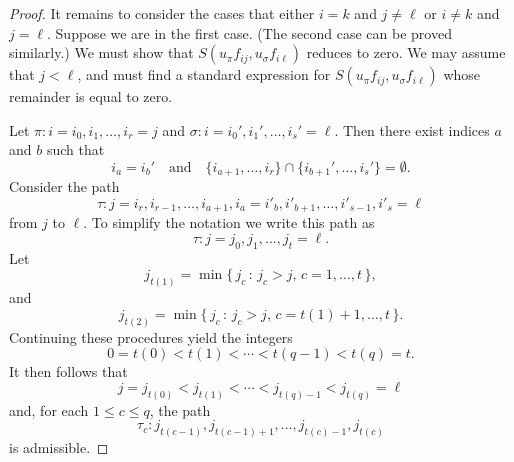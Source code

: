 \documentclass[11pt]{amsart}
\let\sect=\cap
\let\:=\colon
\begin{document}
\begin{proof}
It remains to consider the cases that either $i=k$ and $j\neq \ell$ or $i\neq k$ and $j=\ell$.
Suppose we are in the first case.
(The second case can be proved similarly.)
We must show that $S(u_\pi f_{ij}, u_\sigma f_{i\ell})$ reduces to zero. We may assume that $j<\ell$, and must find a standard expression for $S(u_\pi f_{ij}, u_\sigma f_{i\ell})$
whose remainder is equal to zero.

Let $\pi: i=i_0,i_1,\ldots,i_r=j$ and $\sigma\: i=i_0',i_1',\ldots,i_s'=\ell$. Then there exist %
indices $a$ and $b$ such that
\[
i_a=i_b'\quad \text{and}\quad \{i_{a+1},\ldots,i_r\}\sect\{i_{b+1}',\ldots,i_s'\}=\emptyset.
\]
Consider the path
\[
\tau: j=i_r,i_{r-1},\ldots,i_{a+1},i_a=i'_b,i'_{b+1},\ldots,i'_{s-1}, i'_s=\ell
\]
from $j$ to $\ell$. To simplify the notation we write this path as
\[
\tau\: j=j_0,j_1,\ldots,j_t=\ell.
\]
Let
\[
j_{t(1)} = \min\{ \, j_c \, : \, j_c > j, \, c = 1, \ldots, t \, \},
\]
and
\[
j_{t(2)} = \min\{ \, j_c \, : \, j_c > j, \, c = t(1) + 1, \ldots, t \, \}.
\]
Continuing these procedures yield the integers
\[
0 = t(0) < t(1) < \cdots < t(q-1) < t(q) = t.
\]
It then follows that
\[
j =j _{t(0)} <  j_{t(1)} < \cdots < j_{t(q)-1} < j_{t(q)} = \ell
\]
and, for each $1 \leq c \leq q$, the path
\[
\tau_c : j_{t(c-1)}, j_{t(c-1)+1}, \ldots, j_{t(c)-1}, j_{t(c)}
\]
is admissible.


\end{proof}
\end{document}
